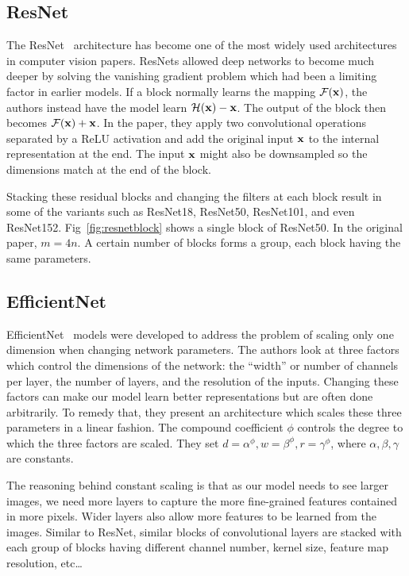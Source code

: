 \documentclass[conference]{IEEEtran}
\begin{document}
\subsection{ResNet}
The ResNet~\cite{he2016deep} architecture has become one of the most widely used
architectures in computer vision papers.
ResNets allowed deep networks to become much deeper by solving the vanishing gradient 
problem which had been a limiting factor in earlier models.
If a block normally learns the mapping $\mathcal{F}(\bold{x})$, the authors
instead have the model learn $\mathcal{H}(\bold{x}) - \boldsymbol{\bold{x}}$.
The output of the block then becomes $\mathcal{F}(\bold{x}) + \bold{x}$.
In the paper, they apply two convolutional operations separated by a ReLU activation
and add the original input $\bold{x}$ to the internal representation at the end.
The input $\bold{x}$ might also be downsampled so the dimensions match at the end of the block.

Stacking these residual blocks and changing the filters at each block result in some
of the variants such as ResNet18, ResNet50, ResNet101, and even ResNet152.
Fig~\ref{fig:resnetblock} shows a single block of ResNet50.
In the original paper, $m=4n$.
A certain number of blocks forms a group, each block having the same parameters.


\subsection{EfficientNet}
EfficientNet~\cite{tan2019efficientnet} models were developed to address the problem 
of scaling only one dimension when changing network parameters.
The authors look at three factors which control the dimensions of the network:
the ``width'' or number of channels per layer, the number of layers, and the resolution
of the inputs.
Changing these factors can make our model learn better representations but are often
done arbitrarily.
To remedy that, they present an architecture which scales these three parameters in a linear fashion.
The compound coefficient $\phi$ controls the degree to which the three factors are scaled.
They set $d=\alpha^\phi, w=\beta^\phi, r=\gamma^\phi$, where $\alpha, \beta, \gamma$ are constants.

The reasoning behind constant scaling is that as our model needs to see  larger images, we need more 
layers to capture the more fine-grained features contained in more pixels.
Wider layers also allow more features to be learned from the images.
Similar to ResNet, similar blocks of convolutional layers are stacked with each group of blocks 
having different channel number, kernel size, feature map resolution, etc\dots
\end{document}
